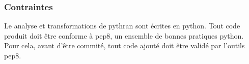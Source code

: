 \documentclass[a4paper]{article}
\begin{document}
\subsubsection{Contraintes}

Le analyse et transformations de pythran sont écrites en python. Tout code produit doit être conforme à pep8, un ensemble de bonnes pratiques python. Pour cela, avant d'être commité, tout code ajouté doit être validé par l'outils pep8.

\clearpage

\appendix


\listoffigures            



\end{document}
